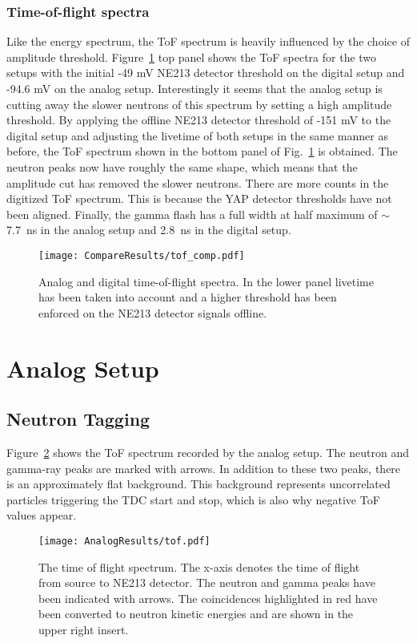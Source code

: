 \documentclass[main.tex]{subfiles}
\begin{document}
\subsubsection{Time-of-flight spectra}
Like the energy spectrum, the ToF spectrum is heavily influenced by the choice of amplitude threshold. Figure~\ref{fig:tof_comp} top panel shows the ToF spectra for the two setups with the initial -49 mV NE213 detector threshold on the digital setup and -94.6 mV on the analog setup. Interestingly it seems that the analog setup is cutting away the slower neutrons of this spectrum by setting a high amplitude threshold. By applying the offline NE213 detector threshold of -151 mV to the digital setup and adjusting the livetime of both setups in the same manner as before, the ToF spectrum shown in the bottom panel of Fig.~\ref{fig:tof_comp} is obtained. The neutron peaks now have roughly the same shape, which means that the amplitude cut has removed the slower neutrons.
There are more counts in the digitized ToF spectrum. This is because the YAP detector thresholds have not been aligned.
Finally, the gamma flash has a full width at half maximum of $\sim$\SI{7.7}{ns} in the analog setup and \SI{2.8}{ns} in the digital setup.

\begin{figure}[h]
    \centering
        \texttt{[image: CompareResults/tof\_comp.pdf]}
        \caption[Analog and digital time-of-flight spectra.]{Analog and digital time-of-flight spectra. In the lower panel livetime has been taken into account and a higher threshold has been enforced on the NE213 detector signals offline.}
    \label{fig:tof_comp}
\end{figure}




\section{Analog Setup}

\subsection{Neutron Tagging}
Figure~\ref{fig:tof_a} shows the ToF spectrum recorded by the analog setup. The neutron and gamma-ray peaks are marked with arrows. In addition to these two peaks, there is an approximately flat background. This background represents uncorrelated particles triggering the TDC start and stop, which is also why negative ToF values appear.
\begin{figure}[ht]
    \centering
        \texttt{[image: AnalogResults/tof.pdf]}
        \caption[Time of flight spectrum, analog setup.]{The time of flight spectrum. The x-axis denotes the time of flight from source to NE213 detector. The neutron and gamma peaks have been indicated with arrows. The coincidences highlighted in red have been converted to neutron kinetic energies and are shown in the upper right insert.}
    \label{fig:tof_a}
\end{figure}
\end{document}
